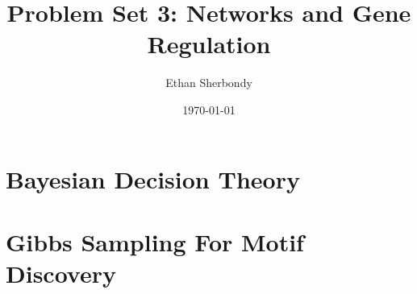 \documentclass{article}
\author{Ethan Sherbondy}
\date{\today}
\title{Problem Set 3: Networks and Gene Regulation}
\begin{document}
  
\maketitle  
\section{Bayesian Decision Theory}  

\section{Gibbs Sampling For Motif Discovery}
\end{document}
